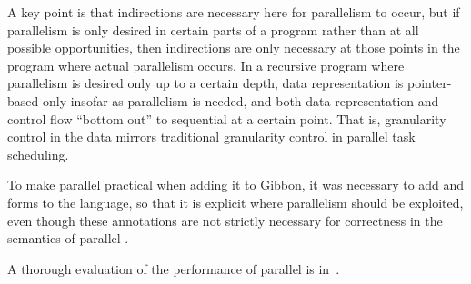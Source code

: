 A key point is that indirections are necessary here for parallelism to occur,
but if parallelism is only desired in certain parts of a program rather than at
all possible opportunities, then indirections are only necessary at those points
in the program where actual parallelism occurs. In a recursive program where
parallelism is desired only up to a certain depth, data representation is
pointer-based only insofar as parallelism is needed, and both data
representation and control flow ``bottom out'' to sequential at a certain point.
That is, granularity control in the data mirrors traditional
granularity control in parallel task scheduling.

To make parallel \ourcalc{} practical when adding it to Gibbon, it was
necessary to add  and  forms to the language, so
that it is explicit where parallelism should be exploited, even though these
annotations are not strictly necessary for correctness in the semantics of
parallel \ourcalc{}.

A thorough evaluation of the performance of parallel \ourcalc{} is
in~.
